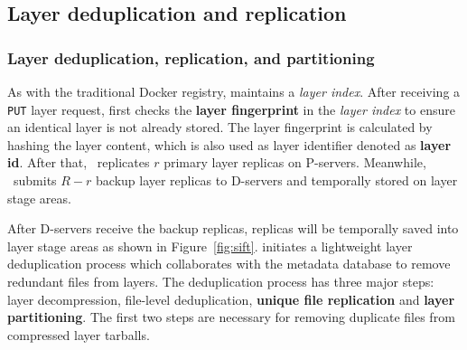 \subsection{Layer deduplication and replication}
\label{sec:dedup-desgin}

%
%

\subsubsection{Layer deduplication, replication, and partitioning}

As with the traditional Docker registry, 
\sysname maintains a \emph{layer index}.
After receiving a \texttt{PUT} layer request,
\sysname first checks the \textbf{layer fingerprint} in the \emph{layer index} to ensure 
an identical layer is not already stored.
The layer fingerprint is calculated by hashing the layer content, which is also used as layer identifier denoted as \textbf{layer id}.
After that, \sysname~replicates $r$ primary layer replicas on P-servers. 
Meanwhile, \sysname~submits $R-r$ backup layer replicas to D-servers and temporally stored on layer stage areas.

 
 After D-servers receive the backup replicas,
 replicas will be temporally saved into layer stage areas as shown in Figure~\ref{fig:sift}.
 \sysname initiates a lightweight layer deduplication process which collaborates with the metadata database
 to remove redundant files from layers. 
The deduplication process has three major steps: 
layer decompression, 
file-level deduplication,
\textbf{unique file replication} and \textbf{layer partitioning}. 
The first two steps are necessary for removing duplicate files from compressed layer tarballs.

